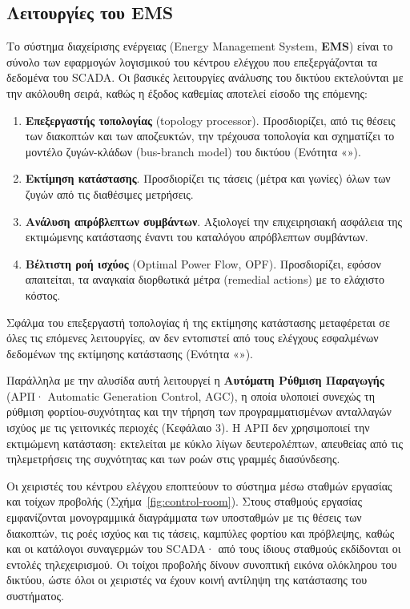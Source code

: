\subsection{Λειτουργίες του EMS}

Το σύστημα διαχείρισης ενέργειας (Energy Management System, \textbf{EMS}) είναι το σύνολο των
εφαρμογών λογισμικού του κέντρου ελέγχου που επεξεργάζονται τα δεδομένα του SCADA. Οι βασικές λειτουργίες ανάλυσης του δικτύου εκτελούνται με την
ακόλουθη σειρά, καθώς η έξοδος καθεμίας αποτελεί είσοδο της επόμενης:

\begin{enumerate}
\item \textbf{Επεξεργαστής τοπολογίας} (topology processor). Προσδιορίζει, από τις θέσεις
      των διακοπτών και των αποζευκτών, την τρέχουσα τοπολογία και σχηματίζει το μοντέλο
      ζυγών-κλάδων (bus-branch model) του δικτύου (Ενότητα «»).
\item \textbf{Εκτίμηση κατάστασης}. Προσδιορίζει τις τάσεις (μέτρα και γωνίες) όλων των
      ζυγών από τις διαθέσιμες μετρήσεις.
\item \textbf{Ανάλυση απρόβλεπτων συμβάντων}. Αξιολογεί την επιχειρησιακή ασφάλεια της
      εκτιμώμενης κατάστασης έναντι του καταλόγου απρόβλεπτων συμβάντων.
\item \textbf{Βέλτιστη ροή ισχύος} (Optimal Power Flow, OPF). Προσδιορίζει, εφόσον
      απαιτείται, τα αναγκαία διορθωτικά μέτρα (remedial actions) με το ελάχιστο κόστος.
\end{enumerate}

Σφάλμα του επεξεργαστή τοπολογίας ή της εκτίμησης κατάστασης μεταφέρεται σε όλες τις
επόμενες λειτουργίες, αν δεν εντοπιστεί από τους ελέγχους εσφαλμένων δεδομένων της εκτίμησης
κατάστασης (Ενότητα «»).

Παράλληλα με την αλυσίδα αυτή λειτουργεί η \textbf{Αυτόματη Ρύθμιση Παραγωγής} (ΑΡΠ· Automatic
Generation Control, AGC), η οποία υλοποιεί συνεχώς τη ρύθμιση φορτίου-συχνότητας και την
τήρηση των προγραμματισμένων ανταλλαγών ισχύος με τις γειτονικές περιοχές
(Κεφάλαιο 3). Η ΑΡΠ δεν χρησιμοποιεί την εκτιμώμενη κατάσταση:
εκτελείται με κύκλο λίγων δευτερολέπτων, απευθείας από τις τηλεμετρήσεις της συχνότητας και
των ροών στις γραμμές διασύνδεσης.

Οι χειριστές του κέντρου ελέγχου εποπτεύουν το σύστημα μέσω σταθμών εργασίας και τοίχων
προβολής (Σχήμα~\ref{fig:control-room}). Στους σταθμούς εργασίας εμφανίζονται μονογραμμικά
διαγράμματα των υποσταθμών με τις θέσεις των διακοπτών, τις ροές ισχύος και τις τάσεις,
καμπύλες φορτίου και πρόβλεψης, καθώς και οι κατάλογοι συναγερμών του SCADA· από τους ίδιους
σταθμούς εκδίδονται οι εντολές τηλεχειρισμού. Οι τοίχοι προβολής δίνουν συνοπτική εικόνα
ολόκληρου του δικτύου, ώστε όλοι οι χειριστές να έχουν κοινή αντίληψη της κατάστασης του
συστήματος.

